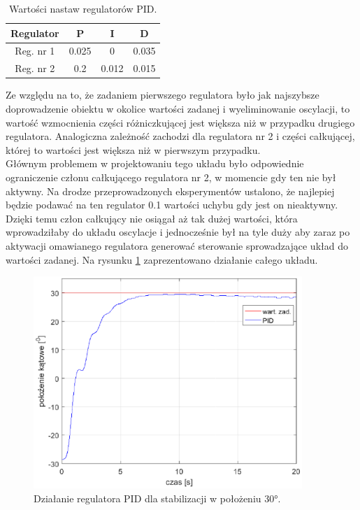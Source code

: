\documentclass[11pt,a4paper]{article}
\begin{document}
\begin{table}[ht]
	\caption{Wartości nastaw regulatorów PID.}
	\label{nastawy_pid}
	\centering
	
	\begin{tabular}{|c|c|c|c|}
		\hline
		Regulator &P&I&D\\
		\hline
		Reg. nr 1 &0.025&   0 &  0.035\\
		\hline
		Reg. nr 2 &0.2 &0.012 &0.015\\ 
		\hline
	\end{tabular}
\end{table}

Ze względu na to, że zadaniem pierwszego regulatora było jak najszybsze doprowadzenie obiektu w okolice wartości zadanej i wyeliminowanie oscylacji, to wartość wzmocnienia części różniczkującej jest większa niż w przypadku drugiego regulatora. Analogiczna zależność zachodzi dla regulatora nr 2 i części całkującej, której to wartości jest większa niż w pierwszym przypadku. \\
Głównym problemem w projektowaniu tego układu było odpowiednie ograniczenie członu całkującego regulatora nr 2, w momencie gdy ten nie był aktywny. Na drodze przeprowadzonych eksperymentów  ustalono, że najlepiej będzie podawać na ten regulator 0.1 wartości uchybu gdy jest on nieaktywny. Dzięki temu człon całkujący nie osiągał aż tak dużej wartości, która wprowadziłaby do układu oscylacje i jednocześnie był na tyle duży aby zaraz po aktywacji omawianego regulatora generować sterowanie sprowadzające układ do wartości zadanej.  Na rysunku \ref{fig:PID_30} zaprezentowano działanie całego układu.

\begin{figure}[H]
	\centering
	\includegraphics[width=4in]{Figures/pid30.eps}
	\caption{Działanie regulatora PID dla stabilizacji w położeniu \ang{30}.}
	\label{fig:PID_30}
\end{figure}
\end{document}
